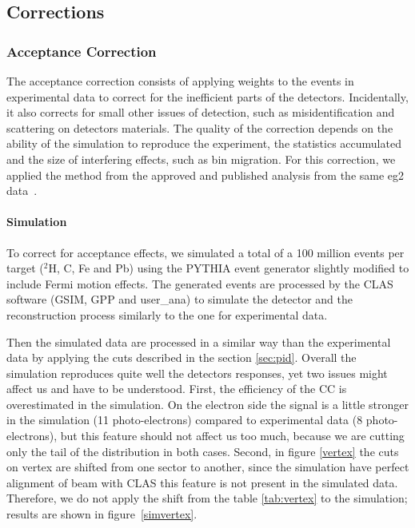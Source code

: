 \subsection{Corrections}
\label{sec:corrections}

\subsubsection{Acceptance Correction}
\label{sec:accept}

The acceptance correction consists of applying weights to the events in 
experimental data to correct for the inefficient parts of the detectors.
Incidentally, it also corrects for small other issues of detection,
such as misidentification and scattering on detectors materials. The quality 
of the correction depends on the ability of the simulation to reproduce the 
experiment, the statistics accumulated and the size of interfering effects, such 
as bin migration. For this correction, we applied the method from the 
approved and published analysis from the same eg2 data~\cite{ElFassi:2008}.

\paragraph{Simulation}
\label{sec:simul}

To correct for acceptance effects, we simulated a total of a 100 million events 
per target ($^2$H, C, Fe and Pb) using the PYTHIA \cite{Sjostrand:2006za} 
event generator slightly modified to include Fermi motion effects. The 
generated events are processed by the CLAS software (GSIM, GPP and user\_ana) 
to simulate the detector and the reconstruction process similarly to the one for 
experimental data.

Then the simulated data are processed in a similar way than the experimental data by 
applying the cuts described in the section \ref{sec:pid}. Overall the 
simulation reproduces quite well the detectors responses, yet two issues might 
affect us and have to be understood. First, the efficiency of the CC is 
overestimated in the simulation. 
On the electron side the signal is a little stronger in the simulation (11 
photo-electrons) compared to experimental data (8 photo-electrons), but this 
feature should not affect us too much, because we are cutting only the tail of the 
distribution in both cases. 
Second, in figure \ref{vertex} the cuts on vertex are shifted from one sector 
to another, since the simulation have perfect alignment of beam with CLAS this 
feature is not present in the simulated data. Therefore, we do not apply the 
shift from the table \ref{tab:vertex} to the simulation; results are shown in 
figure~\ref{simvertex}.

